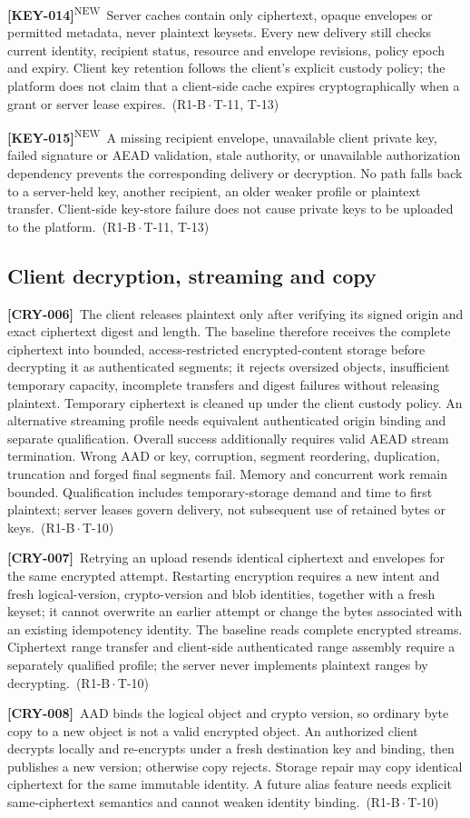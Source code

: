 \documentclass[11pt,a4paper]{article}
\newcommand{\reqtag}[2]{{\footnotesize\color{accent}(#1\,$\cdot$\,#2)}}
\newcommand{\req}[4]{\par\noindent\hypertarget{req:#1}{\textbf{[#1]}}\ #4\ \reqtag{#2}{#3}\par}
\newcommand{\reqn}[4]{\par\noindent\hypertarget{req:#1}{\textbf{[#1]}}\textsuperscript{\color{accent}\tiny NEW}\ #4\ \reqtag{#2}{#3}\par}
\begin{document}
\reqn{KEY-014}{R1-B}{T-11, T-13}{Server caches contain only ciphertext, opaque envelopes or permitted metadata, never plaintext keysets. Every new delivery still checks current identity, recipient status, resource and envelope revisions, policy epoch and expiry. Client key retention follows the client's explicit custody policy; the platform does not claim that a client-side cache expires cryptographically when a grant or server lease expires.}
\reqn{KEY-015}{R1-B}{T-11, T-13}{A missing recipient envelope, unavailable client private key, failed signature or AEAD validation, stale authority, or unavailable authorization dependency prevents the corresponding delivery or decryption. No path falls back to a server-held key, another recipient, an older weaker profile or plaintext transfer. Client-side key-store failure does not cause private keys to be uploaded to the platform.}

\subsection{Client decryption, streaming and copy}
\req{CRY-006}{R1-B}{T-10}{The client releases plaintext only after verifying its signed origin and exact ciphertext digest and length. The baseline therefore receives the complete ciphertext into bounded, access-restricted encrypted-content storage before decrypting it as authenticated segments; it rejects oversized objects, insufficient temporary capacity, incomplete transfers and digest failures without releasing plaintext. Temporary ciphertext is cleaned up under the client custody policy. An alternative streaming profile needs equivalent authenticated origin binding and separate qualification. Overall success additionally requires valid AEAD stream termination. Wrong AAD or key, corruption, segment reordering, duplication, truncation and forged final segments fail. Memory and concurrent work remain bounded. Qualification includes temporary-storage demand and time to first plaintext; server leases govern delivery, not subsequent use of retained bytes or keys.}
\req{CRY-007}{R1-B}{T-10}{Retrying an upload resends identical ciphertext and envelopes for the same encrypted attempt. Restarting encryption requires a new intent and fresh logical-version, crypto-version and blob identities, together with a fresh keyset; it cannot overwrite an earlier attempt or change the bytes associated with an existing idempotency identity. The baseline reads complete encrypted streams. Ciphertext range transfer and client-side authenticated range assembly require a separately qualified profile; the server never implements plaintext ranges by decrypting.}
\req{CRY-008}{R1-B}{T-10}{AAD binds the logical object and crypto version, so ordinary byte copy to a new object is not a valid encrypted object. An authorized client decrypts locally and re-encrypts under a fresh destination key and binding, then publishes a new version; otherwise copy rejects. Storage repair may copy identical ciphertext for the same immutable identity. A future alias feature needs explicit same-ciphertext semantics and cannot weaken identity binding.}
\end{document}

